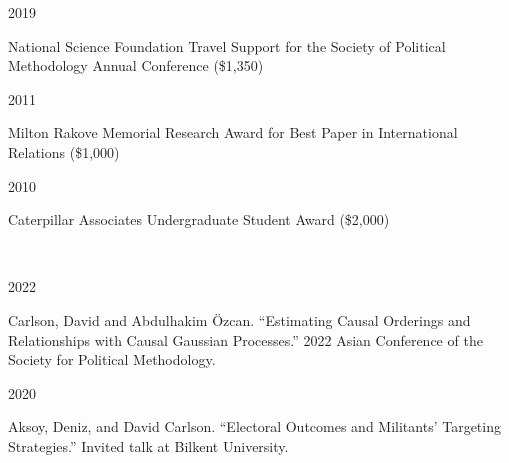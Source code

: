 \documentclass[12pt]{article}
\begin{document}
\begin{minipage}[t]{.15\textwidth}
2019\\
\end{minipage}
\begin{minipage}[t]{.8\textwidth}
\FlushLeft
National Science Foundation Travel Support for the Society of Political Methodology Annual Conference (\$1,350)\\
\end{minipage}
\vspace{.5cm}


\begin{minipage}[t]{.15\textwidth}
2011\\
\end{minipage}
\begin{minipage}[t]{.8\textwidth}
\FlushLeft
Milton Rakove Memorial Research Award for Best Paper in International Relations (\$1,000)\\
\end{minipage}
\vspace{.5cm}

\begin{minipage}[t]{.15\textwidth}
2010\\
\end{minipage}
\begin{minipage}[t]{.8\textwidth}
\FlushLeft
Caterpillar Associates Undergraduate Student Award (\$2,000)\\
\end{minipage}

\vspace{.35cm}
\\
\vspace{.35cm}

\begin{minipage}[t]{.15\textwidth}
2022\\%
\end{minipage}
\begin{minipage}[t]{.8\textwidth}
\FlushLeft
Carlson, David and Abdulhakim \"{O}zcan. ``Estimating Causal Orderings and Relationships with Causal Gaussian Processes.'' 2022 Asian Conference of the Society for Political Methodology.\\
\end{minipage}

\vspace{10pt}


\begin{minipage}[t]{.15\textwidth}
2020\\%
\end{minipage}
\begin{minipage}[t]{.8\textwidth}
\FlushLeft
Aksoy, Deniz, and David Carlson. ``Electoral Outcomes and Militants' Targeting Strategies.'' Invited talk at Bilkent University.\\
\end{minipage}
\end{document}
